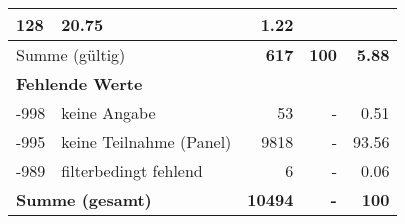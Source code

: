 \begin{longtable}{lXrrr}
       \num{128} &
       \num[round-mode=places,round-precision=2]{20.75} &
         \num[round-mode=places,round-precision=2]{1.22} \\
     \midrule
     \multicolumn{2}{l}{Summe (gültig)} &
       \textbf{\num{617}} &
     \textbf{\num{100}} &
       \textbf{\num[round-mode=places,round-precision=2]{5.88}} \\
     \multicolumn{5}{l}{\textbf{Fehlende Werte}}\\
       -998 &
       keine Angabe &
         \num{53} &
        - &
         \num[round-mode=places,round-precision=2]{0.51} \\
       -995 &
       keine Teilnahme (Panel) &
         \num{9818} &
        - &
         \num[round-mode=places,round-precision=2]{93.56} \\
       -989 &
       filterbedingt fehlend &
         \num{6} &
        - &
         \num[round-mode=places,round-precision=2]{0.06} \\
     \midrule
     \multicolumn{2}{l}{\textbf{Summe (gesamt)}} &
          \textbf{\num{10494}} &
        \textbf{-} &
        \textbf{\num{100}} \\
     \bottomrule
     \end{longtable}
     
